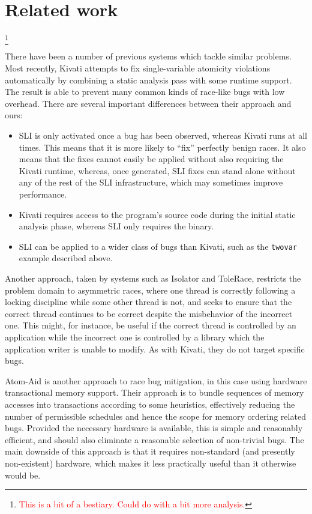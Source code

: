\documentclass[10pt,twocolumn,preprint,natbib,authoryear]{sigplanconf}
\newcommand{\editorial}[1]{\textcolor{red}{\footnote{\textcolor{red}{#1}}}}
\begin{document}
\section{Related work}\editorial{This is a bit of a bestiary.  Could do with a bit more analysis.}

There have been a number of previous systems which tackle similar
problems.  Most recently, Kivati\cite{Chew2010a} attempts to fix
single-variable atomicity violations automatically by combining a
static analysis pass with some runtime support.  The result is able to
prevent many common kinds of race-like bugs with low overhead.  There
are several important differences between their approach and ours:

\begin{itemize}
\item SLI is only activated once a bug has been observed, whereas
  Kivati runs at all times.  This means that it is more likely to
  ``fix'' perfectly benign races.  It also means that the fixes cannot
  easily be applied without also requiring the Kivati runtime,
  whereas, once generated, SLI fixes can stand alone without any of
  the rest of the SLI infrastructure, which may sometimes improve
  performance.
\item Kivati requires access to the program's source code during the
  initial static analysis phase, whereas SLI only requires the binary.
\item SLI can be applied to a wider class of bugs than Kivati, such as
  the \verb|twovar| example described above.
\end{itemize}

Another approach, taken by systems such as
Isolator\cite{Ramalingam2009} and ToleRace\cite{Kirovski2007},
restricts the problem domain to asymmetric races, where one thread is
correctly following a locking discipline while some other thread is
not, and seeks to ensure that the correct thread continues to be
correct despite the misbehavior of the incorrect one.  This might,
for instance, be useful if the correct thread is controlled by an
application while the incorrect one is controlled by a library which
the application writer is unable to modify.  As with Kivati, they do
not target specific bugs.

Atom-Aid\cite{Lucia2009} is another approach to race bug
mitigation, in this case using hardware transactional memory support.
Their approach is to bundle sequences of memory accesses into
transactions according to some heuristics, effectively reducing the
number of permissible schedules and hence the scope for memory
ordering related bugs.  Provided the necessary hardware is available,
this is simple and reasonably efficient, and should also eliminate a
reasonable selection of non-trivial bugs.  The main downside of this
approach is that it requires non-standard (and presently non-existent)
hardware, which makes it less practically useful than it otherwise
would be.
\end{document}
